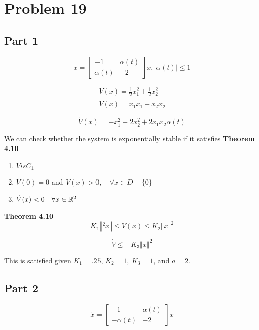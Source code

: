\section*{Problem 19}


\subsection*{Part 1}

$$
\dot{x}=\left[\begin{array}{cc}
-1 & \alpha(t) \\
\alpha(t) & -2
\end{array}\right] x,|\alpha(t)| \leq 1
$$



$$
\begin{array}{l}
V(x)=\frac{1}{2} x_{1}^{2}+\frac{1}{2} x_{2}^{2} \\
\dot{V}(x)=x_{1} \dot{x}_{1}+x_{2} \dot{x}_{2}
\end{array}
$$




$$
\dot{V}(x)=-x_{1}^{2}-2 x_{2}^{2}+2 x_{1} x_{2} \alpha(t)
$$

\noindent We can check whether the system is exponentially stable if it satisfies \textbf{Theorem 4.10}

\begin{enumerate}
  \item $V is C_1$
  \item $V(0)= 0 $ and $V(x) > 0, \quad \forall x \in D - \{ 0\}$
  \item $\dot{V}(x) < 0 \quad \forall x \in \mathbb{R}^2$
\end{enumerate}

\noindent \textbf{Theorem 4.10}
$$
K_1 \left\Vert^2 x \right\Vert \leq V(x) \leq K_2 \left\Vert x \right\Vert^2
$$


$$
\dot{V} \leq -K_3 \left\Vert x \right\Vert^2
$$


\noindent This is satisfied given $K_1 = .25$, $K_2 =1 $, $K_3=1$, and $a =2$.



\subsection*{Part 2}


$$
\dot{x}=\left[\begin{array}{cc}
-1 & \alpha(t) \\
-\alpha(t) & -2
\end{array}\right] x
$$



